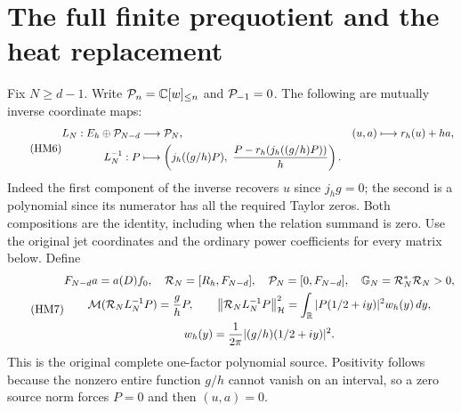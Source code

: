 \documentclass[11pt]{article}
\begin{document}
\section{The full finite prequotient and the heat replacement}
Fix $N\ge d-1$. Write $\mathcal P_n=\mathbb C[w]_{\le n}$ and $\mathcal P_{-1}=0$.
The following are mutually inverse coordinate maps:
\begin{equation}\tag{HM6}
 \begin{aligned}
 L_N:E_h\oplus\mathcal P_{N-d}&\longrightarrow\mathcal P_N,
      &(u,a)&\longmapsto r_h(u)+ha,\\
 L_N^{-1}:P&\longmapsto
 \left(j_h((g/h)P),\ \frac{P-r_h(j_h((g/h)P))}{h}\right).
 \end{aligned}
\end{equation}
Indeed the first component of the inverse recovers $u$ since $j_h g=0$;
the second is a polynomial since its numerator has all the required
Taylor zeros. Both compositions are the identity, including when the
relation summand is zero. Use the original jet coordinates and the
ordinary power coefficients for every matrix below. Define
\begin{equation}\tag{HM7}
 \begin{gathered}
 F_{N-d}a=a(D)f_0,\quad
 \mathcal R_N=[R_h,F_{N-d}],\quad
 \mathcal P_N=[0,F_{N-d}],\quad
 \mathbb G_N=\mathcal R_N^*\mathcal R_N>0,\\
 \mathcal M(\mathcal R_NL_N^{-1}P)=\frac{g}{h}P,\qquad
 \left\lVert\mathcal R_NL_N^{-1}P\right\rVert_{\mathcal H}^2
 =\int_\mathbb R |P(1/2+iy)|^2 w_h(y)\,dy,\\
 w_h(y)=\frac1{2\pi}|(g/h)(1/2+iy)|^2.
 \end{gathered}
\end{equation}
This is the original complete one-factor polynomial source. Positivity
follows because the nonzero entire function $g/h$ cannot vanish on an
interval, so a zero source norm forces $P=0$ and then $(u,a)=0$.
\end{document}
